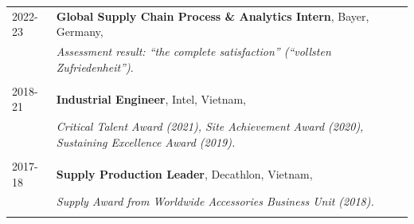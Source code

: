 
\begin{longtable}[l]{@{}p{} p{}}

    2022-23 & \textbf{Global Supply Chain Process \& Analytics Intern}, Bayer, Germany, \\
    & \textit{Assessment result: “the complete satisfaction” (“vollsten Zufriedenheit”)}. \\\\


    2018-21 & \textbf{Industrial Engineer}, Intel, Vietnam, \\
    & \textit{Critical Talent Award (2021), Site Achievement Award (2020), Sustaining Excellence Award (2019).} \\\\

    2017-18 & \textbf{Supply Production Leader}, Decathlon, Vietnam, \\
    & \textit{Supply Award from Worldwide Accessories Business Unit (2018).} \\\\

    

\end{longtable}
